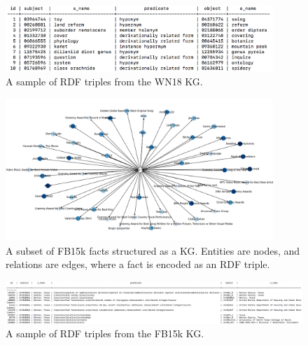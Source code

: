 \begin{figure}[H]
   	\centering
    	\includegraphics[width=0.9\textwidth, height=0.3\textwidth]{wn18_fact_sample}
	\captionsetup{justification=centering}
	\caption{A sample of RDF triples from the WN18 KG.}
\end{figure}

\begin{figure}[H]
   	\centering
    	\includegraphics[width=0.9\textwidth, height=0.5\textwidth]{FB15k_Graph}
	\captionsetup{justification=centering}
	\caption{A subset of FB15k facts structured as a KG. Entities are nodes, and relations are edges, where a fact is encoded as an RDF triple.}
\end{figure}

\begin{figure}[H]
   	\centering
    	\includegraphics[width=1.0\textwidth, height=0.3\textwidth]{fb15k_fact_sample}
	\captionsetup{justification=centering}
	\caption{A sample of RDF triples from the FB15k KG.}
\end{figure}

